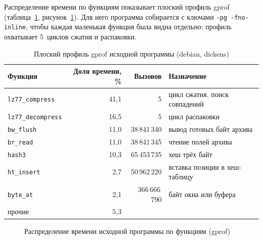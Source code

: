 Распределение времени по функциям показывает плоский профиль gprof
(таблица~\ref{tab:base-gprof}, рисунок~\ref{fig:base-gprof}). Для него
программа собирается с ключами \texttt{-pg -fno-inline}, чтобы каждая
маленькая функция была видна отдельно; профиль охватывает 5~циклов сжатия и
распаковки.

\begin{table}[H]
\caption{Плоский профиль gprof исходной программы (debian, dickens)}
\label{tab:base-gprof}
\begin{tabletext}
\centering
\begin{tabular}{|l|r|r|l|}
\hline
\textbf{Функция} & \textbf{Доля времени, \%} & \textbf{Вызовов} & \textbf{Назначение} \\
\hline
\texttt{lz77\_compress} & 41,1 & 5 & цикл сжатия, поиск совпадений \\
\texttt{lz77\_decompress} & 16,5 & 5 & цикл распаковки \\
\texttt{bw\_flush} & 11,0 & 38\,841\,340 & вывод готовых байт архива \\
\texttt{br\_read} & 11,0 & 38\,841\,345 & чтение полей архива \\
\texttt{hash3} & 10,3 & 65\,453\,735 & хеш трёх байт \\
\texttt{ht\_insert} & 2,7 & 50\,962\,220 & вставка позиции в хеш-таблицу \\
\texttt{byte\_at} & 2,1 & 366\,666\,790 & байт окна или буфера \\
прочие & 5,3 & & \\
\hline
\end{tabular}
\end{tabletext}
\end{table}

\begin{figure}[H]
\centering
{}
\caption{Распределение времени исходной программы по функциям (gprof)}
\label{fig:base-gprof}
\end{figure}

